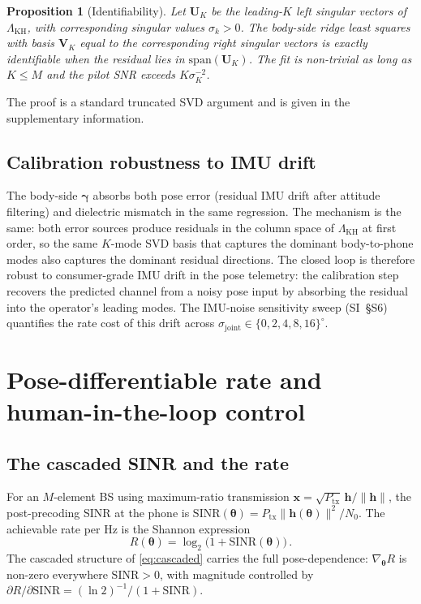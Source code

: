 \documentclass[journal,twocolumn,10pt]{IEEEtran}
\theoremstyle{plain}
\newtheorem{proposition}[theorem]{Proposition}
\theoremstyle{definition}
\theoremstyle{remark}
\newcommand{\xx}{\mathbf{x}}
\newcommand{\hh}{\bm{h}}
\newcommand{\thetab}{\bm{\theta}}
\newcommand{\gammab}{\bm{\gamma}}
\begin{document}
\begin{proposition}[Identifiability]\label{prop:ident}
Let $\bm{U}_K$ be the leading-$K$ left singular vectors of
$\Lambda_{\mathrm{KH}}$, with corresponding singular values $\sigma_k
> 0$. The body-side ridge least squares with basis $\bm{V}_K$ equal
to the corresponding right singular vectors is exactly
identifiable when the residual lies in $\mathrm{span}(\bm{U}_K)$.
The fit is non-trivial as long as $K \leq M$ and the pilot SNR
exceeds $K \sigma_K^{-2}$.
\end{proposition}

The proof is a standard truncated SVD argument and is given in
the supplementary information.

\subsection{Calibration robustness to IMU drift}

The body-side $\gammab$ absorbs both pose error (residual IMU drift
after attitude filtering) and dielectric mismatch in the same
regression. The mechanism is the same: both error sources produce
residuals in the column space of $\Lambda_{\mathrm{KH}}$ at first
order, so the same $K$-mode SVD basis that captures the dominant
body-to-phone modes also captures the dominant residual directions.
The closed loop is therefore robust to consumer-grade IMU drift in
the pose telemetry: the calibration step recovers the predicted
channel from a noisy pose input by absorbing the residual into the
operator's leading modes. The IMU-noise sensitivity sweep (SI~\S{}S6)
quantifies the rate cost of this drift across
$\sigma_{\mathrm{joint}} \in \{0, 2, 4, 8, 16\}^{\circ}$.


\section{Pose-differentiable rate and human-in-the-loop control}\label{sec:control}

\subsection{The cascaded SINR and the rate}

For an $M$-element BS using maximum-ratio transmission $\xx =
\sqrt{P_{\mathrm{tx}}}\,\hh / \|\hh\|$, the post-precoding SINR at
the phone is $\mathrm{SINR}(\thetab) = P_{\mathrm{tx}} \|\hh(\thetab)\|^{2}
/ N_0$. The achievable rate per Hz is the Shannon expression
\begin{equation}\label{eq:rate}
R(\thetab) = \log_2\bigl(1 + \mathrm{SINR}(\thetab)\bigr)\,.
\end{equation}
The cascaded structure of \cref{eq:cascaded} carries the full
pose-dependence: $\nabla_{\thetab} R$ is non-zero everywhere
$\mathrm{SINR}>0$, with magnitude controlled by
$\partial R / \partial \mathrm{SINR} = (\ln 2)^{-1}/(1 + \mathrm{SINR})$.
\end{document}
